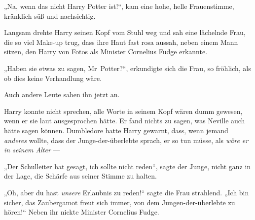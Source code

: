 „Na, wenn das nicht Harry Potter ist!“, kam eine hohe, helle Frauenstimme, kränklich süß und nachsichtig.

Langsam drehte Harry seinen Kopf vom Stuhl weg und sah eine lächelnde Frau, die so viel Make-up trug, dass ihre Haut fast rosa aussah, neben einem Mann sitzen, den Harry von Fotos als Minister Cornelius Fudge erkannte.

„Haben sie etwas zu sagen, Mr~Potter?“, erkundigte sich die Frau, so fröhlich, als ob dies keine Verhandlung wäre.

Auch andere Leute sahen ihn jetzt an.

Harry konnte nicht sprechen, alle Worte in seinem Kopf wären dumm gewesen, wenn er sie laut ausgesprochen hätte. Er fand nichts zu sagen, was Neville auch hätte sagen können. Dumbledore hatte Harry gewarnt, dass, wenn jemand \emph{anderes} wollte, dass der Junge-der-überlebte sprach, er so tun müsse, als \emph{wäre er in seinem Alter} —

„Der Schulleiter hat gesagt, ich sollte nicht reden“, sagte der Junge, nicht ganz in der Lage, die Schärfe aus seiner Stimme zu halten.

„Oh, aber du hast \emph{unsere} Erlaubnis zu reden!“ sagte die Frau strahlend.
„Ich bin sicher, das Zaubergamot freut sich immer, von dem Jungen-der-überlebte zu hören!“
Neben ihr nickte Minister Cornelius Fudge.

